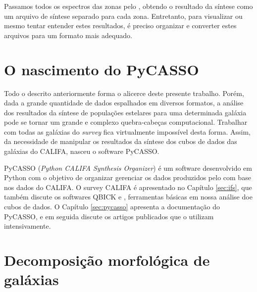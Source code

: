 Passamos todos os espectros das zonas pelo \starlight, obtendo o resultado da
síntese como um arquivo de síntese separado para cada zona. Entretanto, para
visualizar ou mesmo tentar entender estes resultados, é preciso organizar e
converter estes arquivos para um formato mais adequado.



\section{O nascimento do PyCASSO}

Todo o descrito anteriormente forma o alicerce deste presente trabalho. Porém,
dada a grande quantidade de dados espalhados em diversos formatos, a análise dos
resultados da síntese de populações estelares para uma determinada galáxia pode
se tornar um grande e complexo quebra-cabeças computacional. Trabalhar com todas
as galáxias do {\em survey} fica virtualmente impossível desta forma. Assim, da
necessidade de manipular os resultados da síntese dos cubos de dados das
galáxias do CALIFA, nasceu o software PyCASSO.

PyCASSO ({\em Python CALIFA \starlight Synthesis Organizer}) é um software
desenvolvido em Python com o objetivo de organizar gerenciar os dados produzidos
pelo \starlight com base nos dados do CALIFA. O survey CALIFA é apresentado no
Capítulo \ref{sec:ifs}, que também discute os softwares QBICK e \starlight,
ferramentas básicas em nossa análise doe cubos de dados. O Capítulo
\ref{sec:pycasso} apresenta a documentação do PyCASSO, e em seguida discute os
artigos publicados que o utilizam intensivamente.



\section{Decomposição morfológica de galáxias}

